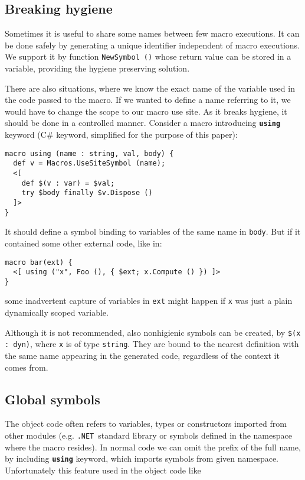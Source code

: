 \documentclass{llncs}
\newcommand{\net}[0]{{\tt .NET}}
\newcommand{\kw}[1]{{\tt \bf #1}}
\begin{document}
\subsection{Breaking hygiene}
Sometimes it is useful to share some names between few macro executions.
It can be done safely by generating a unique identifier independent of macro
executions. We support it by function \verb,NewSymbol (), whose return value
can be stored in a variable, providing the hygiene preserving solution.

There are also situations, where we know the exact name of the variable used in 
the code passed to the macro. If we wanted to define a name referring to it, we 
would have to change the scope to our macro use site. As it breaks hygiene, 
it should be done in a controlled manner. Consider a macro introducing \kw{using} 
keyword (C\# keyword, simplified for the purpose of this paper):

\begin{verbatim}
macro using (name : string, val, body) {
  def v = Macros.UseSiteSymbol (name);
  <[ 
    def $(v : var) = $val;
    try $body finally $v.Dispose ()
  ]>
}
\end{verbatim}

It should define a symbol binding to variables of the same name in \verb,body,.
But if it contained some other external code, like in:

\begin{verbatim}
macro bar(ext) { 
  <[ using ("x", Foo (), { $ext; x.Compute () }) ]> 
}
\end{verbatim} %

\noindent
some inadvertent capture of variables in \verb,ext, might happen if 
\verb,x, was just a plain dynamically scoped variable.

Although it is not recommended, also nonhigienic symbols can be created, by
\verb,$(x : dyn),, where \verb,x, is of type \verb,string,. %
They are bound to the nearest definition with the same name appearing in the
generated code, regardless of the context it comes from.

\subsection{Global symbols}
The object code often refers to variables, types or constructors imported
from other modules (e.g. \net\ standard library or symbols defined in 
the namespace where the macro resides). In normal code we can omit the prefix 
of the full name, by including \kw{using} keyword, which imports symbols from
given namespace. Unfortunately this feature used in the object code like
\end{document}
